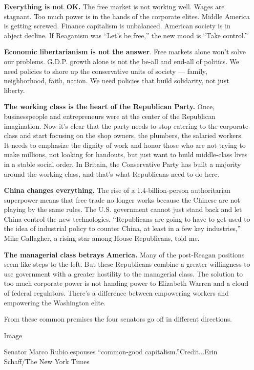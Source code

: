 \textbf{Everything is not OK.} The free market is not working well.
Wages are stagnant. Too much power is in the hands of the corporate
elites. Middle America is getting screwed. Finance capitalism is
unbalanced. American society is in abject decline. If Reaganism was
``Let's be free,'' the new mood is ``Take control.''

\textbf{Economic libertarianism is not the answer}. Free markets alone
won't solve our problems. G.D.P. growth alone is not the be-all and
end-all of politics. We need policies to shore up the conservative units
of society --- family, neighborhood, faith, nation. We need policies
that build solidarity, not just liberty.

\textbf{The working class is the heart of the Republican Party.} Once,
businesspeople and entrepreneurs were at the center of the Republican
imagination. Now it's clear that the party needs to stop catering to the
corporate class and start focusing on the shop owners, the plumbers, the
salaried workers. It needs to emphasize the dignity of work and honor
those who are not trying to make millions, not looking for handouts, but
just want to build middle-class lives in a stable social order. In
Britain, the Conservative Party has built a majority around the working
class, and that's what Republicans need to do here.

\textbf{China changes everything.} The rise of a 1.4-billion-person
authoritarian superpower means that free trade no longer works because
the Chinese are not playing by the same rules. The U.S. government
cannot just stand back and let China control the new technologies.
``Republicans are going to have to get used to the idea of industrial
policy to counter China, at least in a few key industries,'' Mike
Gallagher, a rising star among House Republicans, told me.

\textbf{The managerial class betrays America.} Many of the post-Reagan
positions seem like steps to the left. But these Republicans combine a
greater willingness to use government with a greater hostility to the
managerial class. The solution to too much corporate power is not
handing power to Elizabeth Warren and a cloud of federal regulators.
There's a difference between empowering workers and empowering the
Washington elite.

From these common premises the four senators go off in different
directions.

Image

Senator Marco Rubio espouses ``common-good capitalism.''Credit...Erin
Schaff/The New York Times

